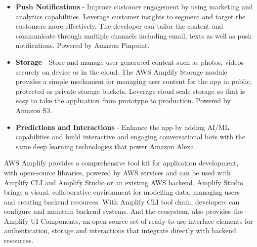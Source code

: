 \begin{itemize}
	\item \textbf{Push Notifications} - Improve customer engagement by using marketing and analytics capabilities. Leverage customer insights to segment and target the customers more effectively. The developer can tailor the content and communicate through multiple channels including email, texts as well as push notifications. Powered by Amazon Pinpoint.
	\item \textbf{Storage} - Store and manage user generated content such as photos, videos securely on device or in the cloud. The AWS Amplify Storage module provides a simple mechanism for managing user content for the app in public, protected or private storage buckets. Leverage cloud scale storage so that is easy to take the application from prototype to production. Powered by Amazon S3.
	\item \textbf{Predictions and Interactions} - Enhance the app by adding AI/ML capabilities and build interactive and engaging conversational bots with the same deep learning technologies that power Amazon Alexa.
\end{itemize}

AWS Amplify provides a comprehensive tool kit for application development, with open-source libraries, powered by AWS services and can be used with Amplify CLI and Amplify Studio or an existing AWS backend. Amplify Studio brings a visual, collaborative environment for modelling data, managing users and creating backend resources. With Amplify CLI tool chain, developers can configure and maintain backend systems. And the ecosystem, also provides the Amplify UI Components, an open-source set of ready-to-use interface elements for authentication, storage and interactions that integrate directly with backend resources.\cite{awsAmplifyFeatures}

